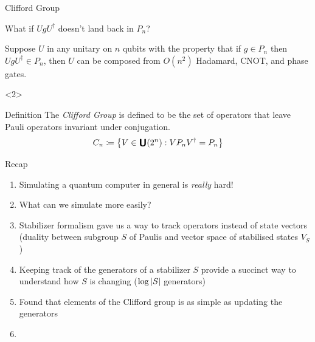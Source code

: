 \documentclass[11pt,aspectratio=1610]{beamer}
\newcommand{\iu}{\mathrm{i}\mkern1mu}
\newcommand{\unitary}[1]{\raisebox{-1pt}{\scalebox{1.2}{$\bm{\mathsf{U}}$}}\qty(#1)}
\begin{document}
\begin{frame}[t]{Clifford Group}
	\begin{warning}
		\begin{center}
			What if $UgU^\dagger$ doesn't land back in $P_n$?
		\end{center}
	\end{warning}

	\begin{theorem}
		Suppose $U$ in any unitary on $n$ qubits with the property that if $g\in P_n$ then $UgU^\dagger\in P_n$, then $U$ can be composed from $O(n^2)$ Hadamard, CNOT, and phase gates.
	\end{theorem}
	\begin{onlyenv}
		\begin{block}{Definition}
			The \emph{Clifford Group} is defined to be the set of operators that leave Pauli operators invariant under conjugation.
			\begin{equation*}
				C_n \coloneqq \qty{V\in \unitary{2^n} : VP_nV^\dagger = P_n}
			\end{equation*}
		\end{block}
	\end{onlyenv}
\end{frame}




\begin{frame}{Recap}
	\begin{enumerate}[<+->]
		\item Simulating a quantum computer in general is \emph{really} hard!
		\item What can we simulate more easily?
		\item Stabilizer formalism gave us a way to track operators instead of state vectors (duality between subgroup $S$ of Paulis and vector space of stabilised states $V_S$)
		\item Keeping track of the generators of a stabilizer $S$ provide a succinct way to understand how $S$ is changing ($\log\abs{S}$ generators)
		\item Found that elements of the Clifford group is as simple as updating the generators
		\item
	\end{enumerate}
\end{frame}
\end{document}
